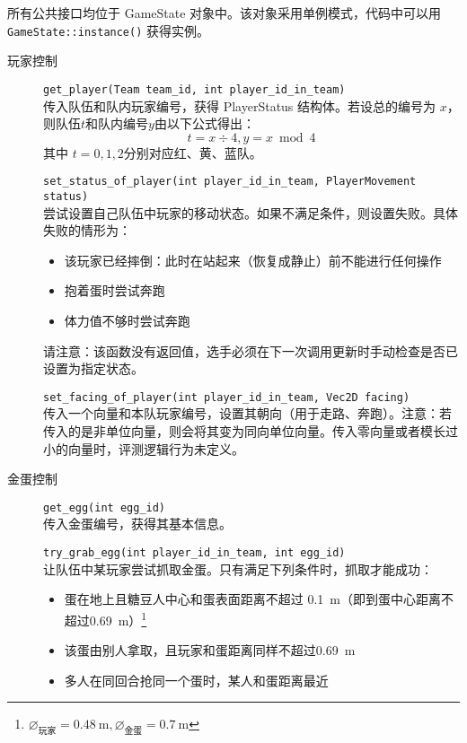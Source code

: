 \documentclass{article}
\begin{document}
所有公共接口均位于 GameState 对象中。该对象采用单例模式，代码中可以用 \lstinline{GameState::instance()} 获得实例。

\begin{description}
\item[玩家控制] \lstinline{get_player(Team team_id, int player_id_in_team)}\\[-2pt]
传入队伍和队内玩家编号，获得 PlayerStatus 结构体。若设总的编号为 $x$，则队伍$t$和队内编号$y$由以下公式得出：
\[t = x \div 4, y = x \bmod 4\]
其中 $t=0,1,2$分别对应红、黄、蓝队。

\lstinline{set_status_of_player(int player_id_in_team, PlayerMovement status)}\\[-2pt]
尝试设置自己队伍中玩家的移动状态。如果不满足条件，则设置失败。具体失败的情形为：
\begin{itemize}\setlength\itemsep{0em}
\item 该玩家已经摔倒：此时在站起来（恢复成静止）前不能进行任何操作
\item 抱着蛋时尝试奔跑
\item 体力值不够时尝试奔跑
\end{itemize}

请注意：该函数\color{red}没有返回值\color{black}，选手必须在下一次调用更新时手动检查是否已设置为指定状态。

\lstinline{set_facing_of_player(int player_id_in_team, Vec2D facing)}\\[-2pt]
传入一个向量和本队玩家编号，设置其朝向（用于走路、奔跑）。注意：若传入的是非单位向量，则会将其变为同向单位向量。传入零向量或者模长过小的向量时，评测逻辑行为未定义。

\item[金蛋控制] \lstinline{get_egg(int egg_id)}\\[-2pt]
传入金蛋编号，获得其基本信息。

\lstinline{try_grab_egg(int player_id_in_team, int egg_id)}\\[-2pt]
让队伍中某玩家尝试抓取金蛋。只有满足下列条件时，抓取才能成功：

\begin{itemize}\setlength\itemsep{0em}
\item 蛋在地上且糖豆人中心和蛋表面距离不超过 \SI{0.1}{\meter}（即到蛋中心距离不超过\SI{0.69}{\meter}）\footnote{$\diameter_{\text{玩家}}=\SI{0.48}{\meter},\diameter_{\text{金蛋}}=\SI{0.7}{\meter}$}
\item 该蛋由别人拿取，且玩家和蛋距离同样不超过\SI{0.69}{\meter}
\item 多人在同回合抢同一个蛋时，某人和蛋距离最近
\end{itemize}


\end{description}
\end{document}
